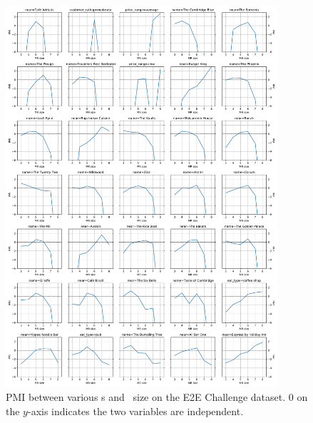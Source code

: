 
\begin{figure}[p]
\centering
    \includegraphics[width=0.9\textwidth]{ch5/figures/trainpmis.pdf}
\caption{PMI between various \attributevalue s and \meaningrepresentation~size
on the E2E Challenge dataset. 0 on the $y$-axis indicates the two variables are independent.}
\label{fig:trainpmi}
\end{figure}
